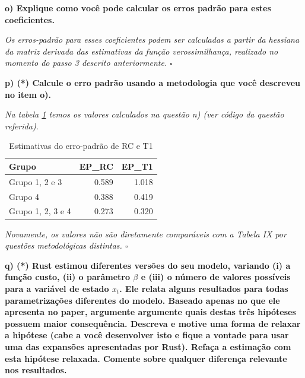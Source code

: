 \documentclass[12pt,a4paper]{article}
\newenvironment{Shaded}{\begin{snugshade}}{\end{snugshade}}
\newcommand{\DataTypeTok}[1]{\textcolor[rgb]{0.13,0.29,0.53}{#1}}
\newcommand{\DecValTok}[1]{\textcolor[rgb]{0.00,0.00,0.81}{#1}}
\newcommand{\KeywordTok}[1]{\textcolor[rgb]{0.13,0.29,0.53}{\textbf{#1}}}
\newcommand{\NormalTok}[1]{#1}
\newcommand{\OperatorTok}[1]{\textcolor[rgb]{0.81,0.36,0.00}{\textbf{#1}}}
\newcommand{\OtherTok}[1]{\textcolor[rgb]{0.56,0.35,0.01}{#1}}
\newcommand{\StringTok}[1]{\textcolor[rgb]{0.31,0.60,0.02}{#1}}
\begin{document}
\textbf{o) Explique como você pode calcular os erros padrão para estes
coeficientes.}

\emph{Os erros-padrão para esses coeficientes podem ser calculadas a
partir da hessiana da matriz derivada das estimativas da função
verossimilhança, realizado no momento do passo 3 descrito anteriormente.
\(\square\)}

\textbf{p) (*) Calcule o erro padrão usando a metodologia que você
descreveu no item o).}

\emph{Na tabela \ref{tab:3} temos os valores calculados na questão n)
(ver código da questão referida).}

\begin{Shaded}
\end{Shaded}

\begin{table}[ht]
\centering
\begin{tabular}{lrr}
  \hline
Grupo & EP\_RC & EP\_T1 \\ 
  \hline
Grupo 1, 2 e 3 & 0.589 & 1.018 \\ 
  Grupo 4 & 0.388 & 0.419 \\ 
  Grupo 1, 2, 3 e 4 & 0.273 & 0.320 \\ 
   \hline
\end{tabular}
\caption{Estimativas do erro-padrão de RC e T1} 
\label{tab:3}
\end{table}

\emph{Novamente, os valores não são diretamente comparáveis com a Tabela
IX por questões metodológicas distintas. \(\square\)}

\textbf{q) (*) Rust estimou diferentes versões do seu modelo, variando
(i) a função custo, (ii) o parâmetro \(\beta\) e (iii) o número de
valores possíveis para a variável de estado \(x_t\). Ele relata alguns
resultados para todas parametrizações diferentes do modelo. Baseado
apenas no que ele apresenta no paper, argumente argumente quais destas
três hipóteses possuem maior consequência. Descreva e motive uma forma
de relaxar a hipótese (cabe a você desenvolver isto e fique a vontade
para usar uma das expansões apresentadas por Rust). Refaça a estimação
com esta hipótese relaxada. Comente sobre qualquer diferença relevante
nos resultados.}
\end{document}

